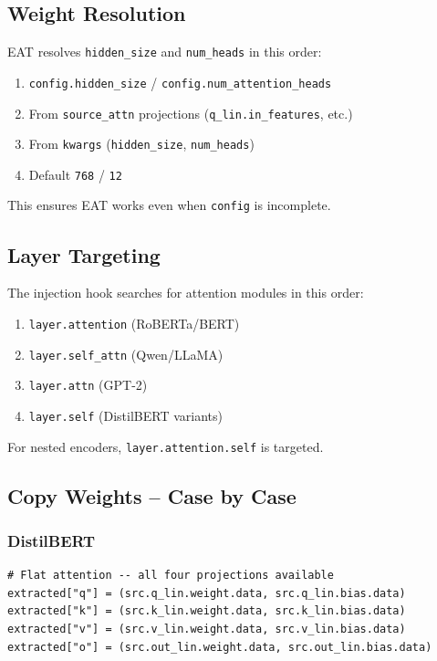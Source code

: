 \subsection{Weight Resolution}

EAT resolves \texttt{hidden\_size} and \texttt{num\_heads} in this order:

\begin{enumerate}
\item \texttt{config.hidden\_size} / \texttt{config.num\_attention\_heads}
\item From \texttt{source\_attn} projections (\texttt{q\_lin.in\_features}, etc.)
\item From \texttt{kwargs} (\texttt{hidden\_size}, \texttt{num\_heads})
\item Default \texttt{768} / \texttt{12}

\end{enumerate}
This ensures EAT works even when \texttt{config} is incomplete.

\subsection{Layer Targeting}

The injection hook searches for attention modules in this order:

\begin{enumerate}
\item \texttt{layer.attention} (RoBERTa/BERT)
\item \texttt{layer.self\_attn} (Qwen/LLaMA)
\item \texttt{layer.attn} (GPT-2)
\item \texttt{layer.self} (DistilBERT variants)

\end{enumerate}
For nested encoders, \texttt{layer.attention.self} is targeted.

\subsection{Copy Weights -- Case by Case}

\subsubsection{DistilBERT}

\begin{lstlisting}
# Flat attention -- all four projections available
extracted["q"] = (src.q_lin.weight.data, src.q_lin.bias.data)
extracted["k"] = (src.k_lin.weight.data, src.k_lin.bias.data)
extracted["v"] = (src.v_lin.weight.data, src.v_lin.bias.data)
extracted["o"] = (src.out_lin.weight.data, src.out_lin.bias.data)
\end{lstlisting}


